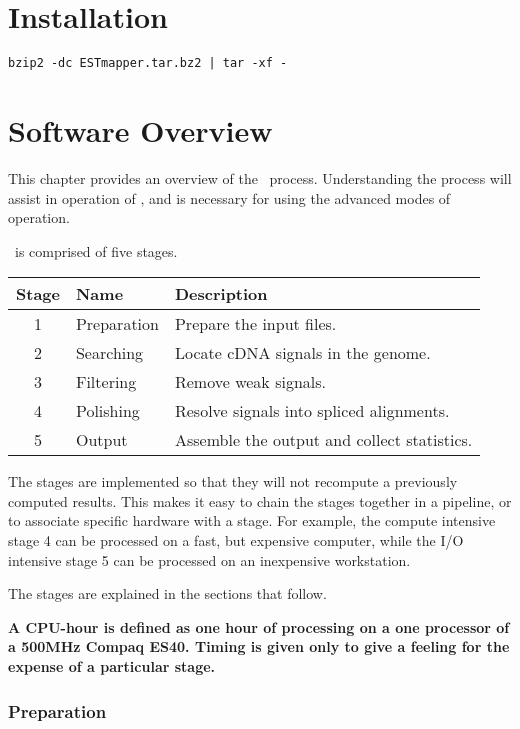 \documentclass[twoside,11pt]{book}
\begin{document}
\chapter{Installation}
\label{chap:install}

{\tt bzip2 -dc ESTmapper.tar.bz2 | tar -xf - }

\chapter{Software Overview}
\label{chap:overview}

This chapter provides an overview of the \ESTmapper\ process.
Understanding the process will assist in operation of \ESTmapper, and
is necessary for using the advanced modes of operation.

\ESTmapper\ is comprised of five stages.

\begin{tabular}{|c|l|l|}
\hline
Stage & Name & Description \\
\hline
\hline
1 & Preparation & Prepare the input files. \\
2 & Searching   & Locate cDNA signals in the genome. \\
3 & Filtering   & Remove weak signals. \\
4 & Polishing   & Resolve signals into spliced alignments. \\
5 & Output      & Assemble the output and collect statistics. \\
\hline
\end{tabular}

The stages are implemented so that they will not recompute a
previously computed results.  This makes it easy to chain the stages
together in a pipeline, or to associate specific hardware with a
stage.  For example, the compute intensive stage 4 can be processed on
a fast, but expensive computer, while the I/O intensive stage 5 can be
processed on an inexpensive workstation.

The stages are explained in the sections that follow.

{\bf A CPU-hour is defined as one hour of processing on a one
processor of a 500MHz Compaq ES40.  Timing is given only to give a
feeling for the expense of a particular stage.}

\subsection*{Preparation}
\end{document}
